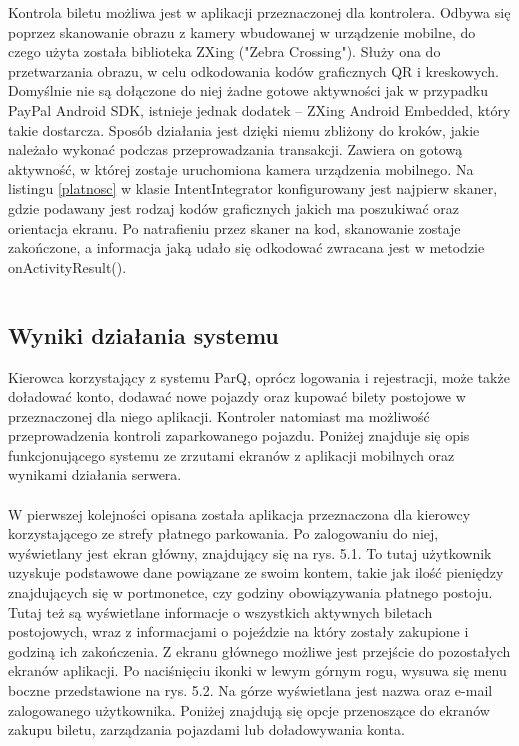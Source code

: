 Kontrola biletu możliwa jest w aplikacji przeznaczonej dla kontrolera. Odbywa się poprzez skanowanie obrazu z kamery wbudowanej w urządzenie mobilne, do czego użyta została biblioteka ZXing ("Zebra Crossing"). Służy ona do przetwarzania obrazu, w celu odkodowania kodów graficznych QR i kreskowych. Domyślnie nie są dołączone do niej żadne gotowe aktywności jak w przypadku PayPal Android SDK, istnieje jednak dodatek -- ZXing Android Embedded, który takie dostarcza. Sposób działania jest dzięki niemu zbliżony do kroków, jakie należało wykonać podczas przeprowadzania transakcji. Zawiera on gotową aktywność, w której zostaje uruchomiona kamera urządzenia mobilnego. Na listingu \ref{platnosc} w klasie IntentIntegrator konfigurowany jest najpierw skaner, gdzie podawany jest rodzaj kodów graficznych jakich ma poszukiwać oraz orientacja ekranu. Po natrafieniu przez skaner na kod, skanowanie zostaje zakończone, a informacja jaką udało się odkodować zwracana jest w metodzie onActivityResult().

\begin{singlespace}
	\label{platnosc}
	\vspace{0.3cm}
	\inputminted[fontsize=\footnotesize]{java}{src/imp/start-scan.java}
\end{singlespace}

\newpage

\subsection{Wyniki działania systemu}

Kierowca korzystający z systemu ParQ, oprócz logowania i rejestracji, może także doładować konto, dodawać nowe pojazdy oraz kupować bilety postojowe w przeznaczonej dla niego aplikacji. Kontroler natomiast ma możliwość przeprowadzenia kontroli zaparkowanego pojazdu. Poniżej znajduje się opis funkcjonującego systemu ze zrzutami ekranów z aplikacji mobilnych oraz wynikami działania serwera.
\\
\\
W pierwszej kolejności opisana została aplikacja przeznaczona dla kierowcy korzystającego ze strefy płatnego parkowania. Po zalogowaniu do niej, wyświetlany jest ekran główny, znajdujący się na rys. 5.1. To tutaj użytkownik uzyskuje podstawowe dane powiązane ze swoim kontem, takie jak ilość pieniędzy znajdujących się w portmonetce, czy godziny obowiązywania płatnego postoju. Tutaj też są wyświetlane informacje o wszystkich aktywnych biletach postojowych, wraz z informacjami o pojeździe na który zostały zakupione i godziną ich zakończenia. Z ekranu głównego możliwe jest przejście do pozostałych ekranów aplikacji. Po naciśnięciu ikonki w lewym górnym rogu, wysuwa się menu boczne przedstawione na rys. 5.2. Na górze wyświetlana jest nazwa oraz e-mail zalogowanego użytkownika. Poniżej znajdują się opcje przenoszące do ekranów zakupu biletu, zarządzania pojazdami lub doładowywania konta.

